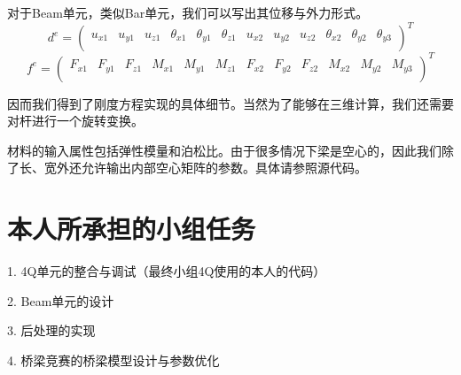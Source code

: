 \documentclass[UTF8]{ctexart}
\begin{document}
对于Beam单元，类似Bar单元，我们可以写出其位移与外力形式。
$$d^e=\left( \begin{matrix}
u_{x1}&		u_{y1}&		u_{z1}&		\theta_{x1}&		\theta_{y1}&		\theta_{z1}&		u_{x2}&		u_{y2}&		u_{z2}&		\theta _{x2}&		\theta _{y2}&		\theta _{y3}\\
\end{matrix} \right) ^T$$
$$f^e=\left( \begin{matrix}
F_{x1}&		F_{y1}&		F_{z1}&		M_{x1}&		M_{y1}&		M_{z1}&		F_{x2}&		F_{y2}&		F_{z2}&		M_{x2}&		M_{y2}&		M_{y3}\\
\end{matrix} \right) ^T$$

因而我们得到了刚度方程实现的具体细节。当然为了能够在三维计算，我们还需要对杆进行一个旋转变换。

材料的输入属性包括弹性模量和泊松比。由于很多情况下梁是空心的，因此我们除了长、宽外还允许输出内部空心矩阵的参数。具体请参照源代码。





\section{本人所承担的小组任务}
1. 4Q单元的整合与调试（最终小组4Q使用的本人的代码）

2. Beam单元的设计

3. 后处理的实现

4. 桥梁竞赛的桥梁模型设计与参数优化


%
\end{document}
